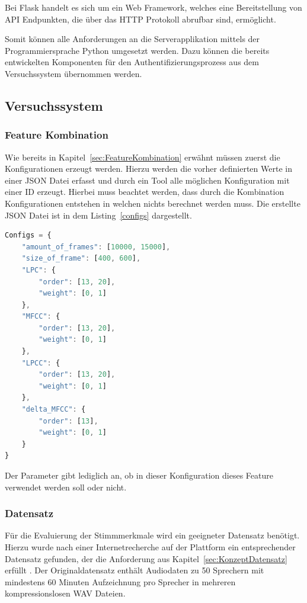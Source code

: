 Bei Flask handelt es sich um ein Web Framework, welches eine Bereitstellung von \ac{API} Endpunkten, die über das \ac{HTTP} Protokoll abrufbar sind, ermöglicht.

Somit können alle Anforderungen an die Serverapplikation mittels der Programmiersprache Python umgesetzt werden.
Dazu können die bereits entwickelten Komponenten für den Authentifizierungsprozess aus dem Versuchssystem übernommen werden.

\subsection{Versuchssystem}

\subsubsection{Feature Kombination}
Wie bereits in Kapitel~\ref{sec:FeatureKombination} erwähnt müssen zuerst die Konfigurationen erzeugt werden.
Hierzu werden die vorher definierten Werte in einer JSON Datei erfasst und durch ein Tool alle möglichen Konfiguration mit einer ID erzeugt.
Hierbei muss beachtet werden, dass durch die Kombination Konfigurationen entstehen in welchen nichts berechnet werden muss.
Die erstellte JSON Datei ist in dem Listing~\ref{configs} dargestellt.
\begin{lstlisting}[language=JavaScript,numbers=none,caption=Konfigurationsmöglichkeiten,label=configs]
Configs = {
    "amount_of_frames": [10000, 15000],
    "size_of_frame": [400, 600],
    "LPC": {
        "order": [13, 20],
        "weight": [0, 1]
    },
    "MFCC": {
        "order": [13, 20],
        "weight": [0, 1]
    },
    "LPCC": {
        "order": [13, 20],
        "weight": [0, 1]
    },
    "delta_MFCC": {
        "order": [13],
        "weight": [0, 1]
    }
}
\end{lstlisting}
Der  Parameter gibt lediglich an, ob in dieser Konfiguration dieses Feature verwendet werden soll oder nicht.

\subsubsection{Datensatz}
Für die Evaluierung der Stimmmerkmale wird ein geeigneter Datensatz benötigt.
Hierzu wurde nach einer Internetrecherche auf der Plattform  ein entsprechender Datensatz gefunden, der die Anforderung aus Kapitel~\ref{sec:KonzeptDatensatz} erfüllt \autocite[vgl.][]{jain_speaker_2019}. 
Der Originaldatensatz enthält Audiodaten zu 50 Sprechern mit mindestens 60 Minuten Aufzeichnung pro Sprecher in mehreren kompressionslosen WAV Dateien.

